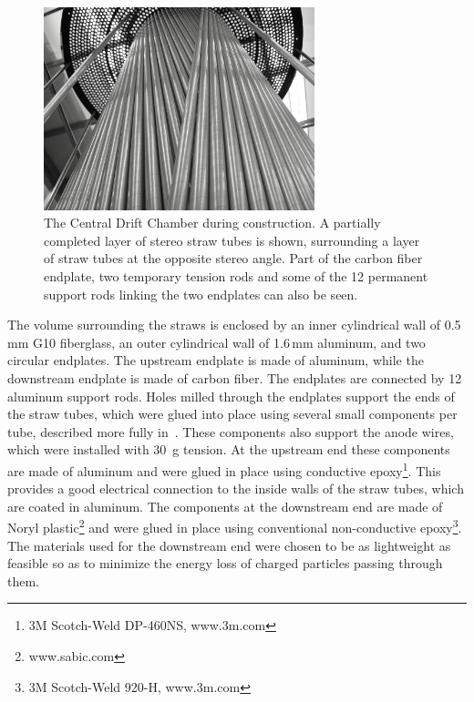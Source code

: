 \begin{figure}[tbp]
\begin{center}
\includegraphics[width=0.7\textwidth]{figures/CDC_stereotubes.jpg}  
\caption{\label{fig:CDC_stereotubes}          
  The Central Drift Chamber during construction. A partially completed layer of stereo straw tubes is shown, surrounding a layer of straw tubes at the opposite stereo angle. Part of the carbon fiber endplate, two temporary tension rods and some of the 12 permanent support rods linking the two endplates can also be seen.}  
\end{center}
\end{figure}

The volume surrounding the straws is enclosed by an inner cylindrical wall of 0.5\,mm G10 fiberglass, an outer cylindrical wall of 1.6\,mm aluminum, and two circular endplates. 
The upstream endplate is made of aluminum, while the downstream endplate is made of carbon fiber. The endplates are connected by 12 aluminum support rods. 
Holes milled through the endplates support the ends of the straw tubes, which were glued into place using several small components per tube, described more fully in~\cite{GlueXCDCNIM}.  
These components also support the anode wires, which were installed with 30~g tension.
At the upstream end these components are made of aluminum and were glued in place using conductive epoxy\footnote{3M Scotch-Weld DP-460NS, www.3m.com}. 
This provides a good electrical connection to the inside walls of the straw tubes, which are coated in aluminum.
The components at the downstream end are made of Noryl plastic\footnote{www.sabic.com} and were glued in place using conventional non-conductive epoxy\footnote{3M Scotch-Weld 920-H, www.3m.com}.
The materials used for the downstream end were chosen to be as lightweight as feasible so as to minimize the energy loss of charged particles passing through them. 

